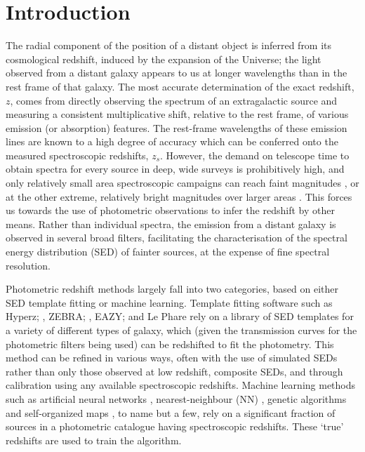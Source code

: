 \documentclass[useAMS,usenatbib,fleqn]{mn2e}
\begin{document}
\section{Introduction}
The radial component of the position of a distant object is inferred from its cosmological redshift, induced by the expansion of the Universe; the light observed from a distant galaxy appears to us at longer wavelengths than in the rest frame of that galaxy. The most accurate determination of the exact redshift, $z$, comes from directly observing the spectrum of an extragalactic source and measuring a consistent multiplicative shift, relative to the rest frame, of various emission (or absorption) features. The rest-frame wavelengths of these emission lines are known to a high degree of accuracy which can be conferred onto the measured spectroscopic redshifts, $z_{s}$. However, the demand on telescope time to obtain spectra for every source in deep, wide surveys is prohibitively high, and only relatively small area spectroscopic campaigns can reach faint magnitudes \citep[e.g.][]{Lilly2009,LeFevre2013,LeFevre2015}, or at the other extreme, relatively bright magnitudes over larger areas \citep[e.g.][]{2dfgrs,GAMA,SDSS3}.
This forces us towards the use of photometric observations to infer the redshift by other means. Rather than individual spectra, the emission from a distant galaxy is observed in several broad filters, facilitating the characterisation of the spectral energy distribution (SED) of fainter sources, at the expense of fine spectral resolution.

Photometric redshift methods largely fall into two categories, based on either SED template fitting or machine learning. Template fitting software such as {\sc Hyperz}; \citep[][]{Hyperz}, {\sc ZEBRA}; \citep{ZEBRA}, {\sc EAZY}; \citep[][]{EAZY} and {\sc Le Phare} \citep[][]{Ilbert2006} rely on a library of SED templates for a variety of different types of galaxy, which (given the transmission curves for the photometric filters being used) can be redshifted to fit the photometry. This method can be refined in various ways, often with the use of simulated SEDs rather than only those observed at low redshift, composite SEDs, and through calibration using any available spectroscopic redshifts. Machine learning methods such as artificial neural networks \citep[e.g. {\sc ANNz};][]{Firth2003,Collister04}, nearest-neighbour (NN) \citep{Ball2008}, genetic algorithms \citep[e.g.][]{Hogan2015} and self-organized maps \citep[][]{Geach2012}, to name but a few, rely on a significant fraction of sources in a photometric catalogue having spectroscopic redshifts. These `true' redshifts are used to train the algorithm. 
\end{document}
